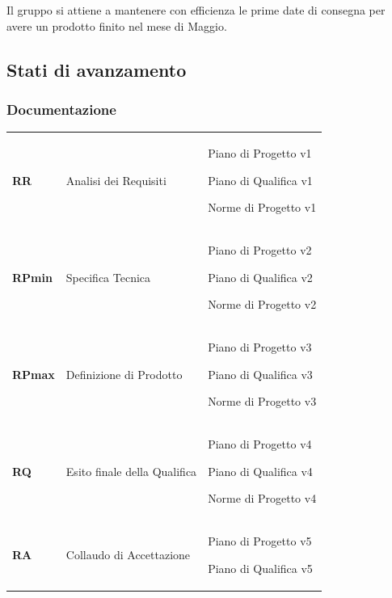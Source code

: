 \documentclass[12pt,a4paper,titlepage]{article}
\begin{document}
Il gruppo si attiene a mantenere con efficienza le prime date di consegna per avere un prodotto finito nel mese di Maggio.

\subsection{Stati di avanzamento}
\subsubsection{Documentazione}
\small
{\renewcommand\arraystretch{1.2}
\begin{tabular}{|p{2cm}|p{5cm}|p{5cm}|}
	\hline
	\textbf{RR} & Analisi dei Requisiti & \begin{trivlist}
												\item Piano di Progetto v1
												\item Piano di Qualifica v1
												\item Norme di Progetto v1
													\end{trivlist}
												\\
	\textbf{RPmin} & Specifica Tecnica & \begin{trivlist}
			\item Piano di Progetto v2
			\item Piano di Qualifica v2
			\item Norme di Progetto v2
	\end{trivlist}
													\\
	\textbf{RPmax} & Definizione di Prodotto & \begin{trivlist}
		\item Piano di Progetto v3
		\item Piano di Qualifica v3
		\item Norme di Progetto v3
	\end{trivlist} \\
	\textbf{RQ} & Esito finale della Qualifica & \begin{trivlist}
		\item Piano di Progetto v4
		\item Piano di Qualifica v4
		\item Norme di Progetto v4
	\end{trivlist}\\
	\textbf{RA} & Collaudo di Accettazione & \begin{trivlist}
															\item Piano di Progetto v5
															\item Piano di Qualifica v5
											 \end{trivlist}\\ 
														 
\hline
\end{tabular}}
\end{document}
